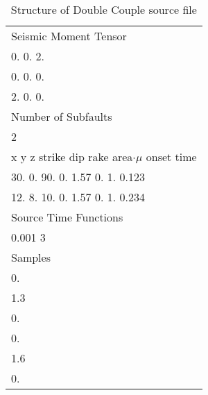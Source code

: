 \documentclass[12pt,twoside]{article}
\begin{document}
\begin{table}
\caption{Structure of Double Couple source file}
\begin{center}
\begin{tabular}{l}
\hline
Seismic Moment Tensor\\
0. \hspace{4mm} 0. \hspace{4mm} 2.\\
0. \hspace{4mm} 0. \hspace{4mm} 0. \\
2. \hspace{4mm} 0. \hspace{4mm} 0. \\
Number of Subfaults\\
2\\
x \hspace{4mm} y \hspace{4mm} z \hspace{4mm} strike \hspace{4mm} dip \hspace{4mm} rake \hspace{4mm} area$\cdot\mu$ \hspace{4mm} onset time\\
30. \hspace{0.5mm} 0. \hspace{2mm} 90.\hspace{6mm} 0. \hspace{7mm} 1.57 \hspace{7mm} 0. \hspace{7mm} 1.\hspace{14mm} 0.123\\
12. \hspace{0.5mm} 8. \hspace{2mm} 10.\hspace{6mm} 0. \hspace{7mm} 1.57 \hspace{7mm} 0. \hspace{7mm} 1.\hspace{14mm} 0.234\\
Source Time Functions\\
0.001\hspace{6mm} 3\\
Samples\\
0.\\
1.3\\
0.\\
0.\\
1.6\\
0.\\
\hline
\end{tabular}
\end{center}
\label{FSRM-source-file}
\end{table}
\end{document}
